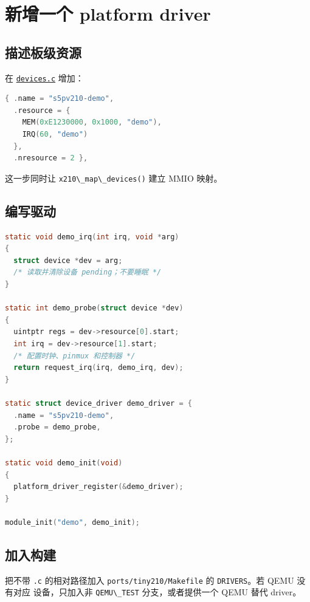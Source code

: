 \section{新增一个 platform
driver}\label{ux65b0ux589eux4e00ux4e2a-platform-driver}

\subsection{描述板级资源}\label{ux63cfux8ff0ux677fux7ea7ux8d44ux6e90}

在
\href{../../../kernel/arch/arm/mach-s5pv210/devices.c}{\passthrough{\lstinline!devices.c!}}
增加：

\begin{lstlisting}[language=C]
{ .name = "s5pv210-demo",
  .resource = {
    MEM(0xE1230000, 0x1000, "demo"),
    IRQ(60, "demo")
  },
  .nresource = 2 },
\end{lstlisting}

这一步同时让 \passthrough{\lstinline!x210\_map\_devices()!} 建立 MMIO
映射。

\subsection{编写驱动}\label{ux7f16ux5199ux9a71ux52a8}

\begin{lstlisting}[language=C]
static void demo_irq(int irq, void *arg)
{
  struct device *dev = arg;
  /* 读取并清除设备 pending；不要睡眠 */
}

static int demo_probe(struct device *dev)
{
  uintptr regs = dev->resource[0].start;
  int irq = dev->resource[1].start;
  /* 配置时钟、pinmux 和控制器 */
  return request_irq(irq, demo_irq, dev);
}

static struct device_driver demo_driver = {
  .name = "s5pv210-demo",
  .probe = demo_probe,
};

static void demo_init(void)
{
  platform_driver_register(&demo_driver);
}

module_init("demo", demo_init);
\end{lstlisting}

\subsection{加入构建}\label{ux52a0ux5165ux6784ux5efa}

把不带 \passthrough{\lstinline!.c!} 的相对路径加入
\passthrough{\lstinline!ports/tiny210/Makefile!} 的
\passthrough{\lstinline!DRIVERS!}。若 QEMU 没有对应 设备，只加入非
\passthrough{\lstinline!QEMU\_TEST!} 分支，或者提供一个 QEMU 替代
driver。

